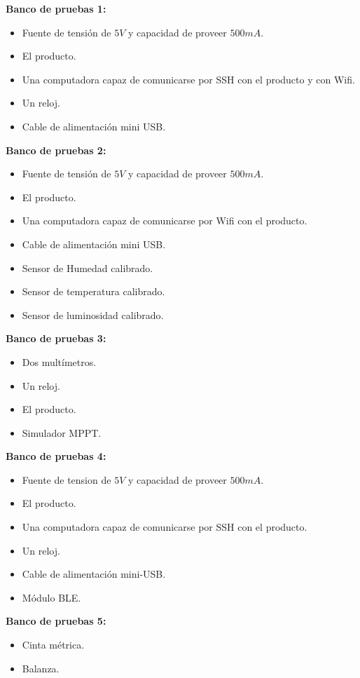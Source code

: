 \textbf{Banco de pruebas 1:}
\begin{itemize}
	\item Fuente de tensión de $5V$ y capacidad de proveer $500 mA$.
	\item El producto.	
	\item Una computadora capaz de comunicarse por SSH con el producto  y con Wifi.
	\item Un reloj.
	\item Cable de alimentación mini USB.
\end{itemize}

\textbf{Banco de pruebas 2:}
\begin{itemize}
	\item Fuente de tensión de $5 V$ y capacidad de proveer $500 mA$.
	\item El producto.	
	\item Una computadora capaz de comunicarse por Wifi con el producto.
	\item Cable de alimentación mini USB.
	\item Sensor de Humedad calibrado.
	\item Sensor de temperatura calibrado.
	\item Sensor de luminosidad calibrado.
\end{itemize}

\textbf{Banco de pruebas 3:}
\begin{itemize}
	\item Dos multímetros.
	\item Un reloj.
	\item El producto.
	\item Simulador MPPT.
\end{itemize}

\textbf{Banco de pruebas 4:}
\begin{itemize}
	\item Fuente de tension de $5V$ y capacidad de proveer $500mA$.
	\item El producto.	
	\item Una computadora capaz de comunicarse por SSH con el producto.
	\item Un reloj.
	\item Cable de alimentación mini-USB.
	\item Módulo BLE.
\end{itemize}


\textbf{Banco de pruebas 5:}
\begin{itemize}
	\item Cinta métrica.
	\item Balanza.
\end{itemize}